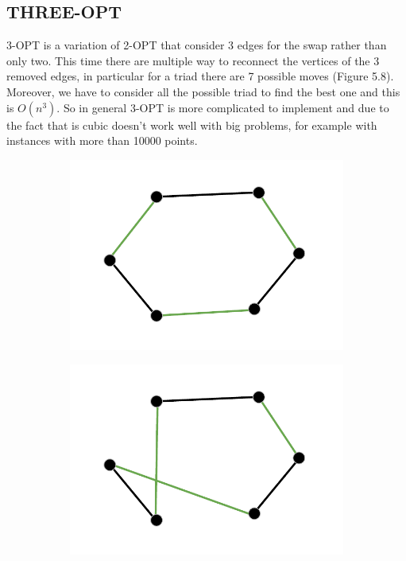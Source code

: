 \subsection{THREE-OPT}
3-OPT is a variation of 2-OPT that consider 3 edges for the swap rather than only two. This time there are multiple way to reconnect the vertices of the 3 removed edges, in particular for a triad there are 7 possible moves (Figure 5.8). Moreover, we have to consider all the possible triad to find the best one and this is $O(n^3)$. So in general 3-OPT is more complicated to implement and due to the fact that is cubic doesn't work well with big problems, for example with instances with more than 10000 points.

\begin{figure}[h!]
  \centering
  \begin{subfigure}[b]{0.24\linewidth}
    \includegraphics[width=\linewidth]{media/threeopt1.pdf}
     \caption{}
  \end{subfigure}
  \begin{subfigure}[b]{0.24\linewidth}
    \includegraphics[width=\linewidth]{media/threeopt2.pdf}

\end{subfigure}
\end{figure}

